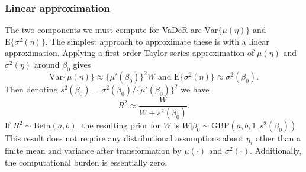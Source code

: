 \documentclass[12pt]{article}
\begin{document}
\subsubsection{Linear approximation}\label{s:deltamethod}
The two components we must compute for VaDeR are $\mbox{Var}\{\mu(\eta)\}$ and $\mbox{E}\{\sigma^2(\eta)\}$. The simplest approach to approximate these is with a linear approximation. Applying a first-order Taylor series approximation of $\mu(\eta)$ and $\sigma^2(\eta)$ around $\beta_0$ gives
\begin{equation}
    \mbox{Var}\{\mu(\eta)\}
    \approx \{\mu'(\beta_0)\}^2W
\mbox{\ \ \ and \ \ \ }
    \mbox{E}\{\sigma^2(\eta)\}
    \approx \sigma^2(\beta_0).
\end{equation}
Then denoting $s^2(\beta_0) = \sigma^2(\beta_0)/\{\mu'(\beta_0)\}^2$ we have
\begin{equation}\label{eq:delta}
    R^2
    \approx \frac{W}{W+s^2(\beta_0)}.
\end{equation}
If $R^2\sim\mbox{Beta}(a,b)$, the resulting prior for $W$ is $W|\beta_0\sim\mbox{GBP}(a,b,1,s^2(\beta_0))$. This result does not require any distributional assumptions about $\eta_i$ other than a finite mean and variance after transformation by $\mu(\cdot)$ and $\sigma^2(\cdot)$. Additionally, the computational burden is essentially zero.
\end{document}
